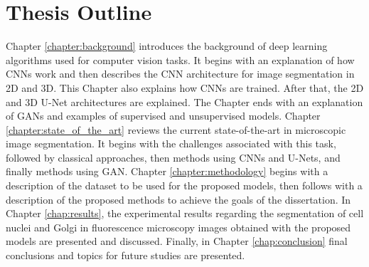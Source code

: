 
\section{Thesis Outline}

Chapter \ref{chapter:background} introduces the background of deep learning algorithms used for computer vision tasks. It begins with an explanation of how \ac{CNNs} work and then describes the \ac{CNN} architecture for image segmentation in \ac{2D} and \ac{3D}. This Chapter also explains how \ac{CNNs} are trained. After that, the \ac{2D} and \ac{3D} U-Net architectures are explained. The Chapter ends with an explanation of \ac{GANs} and examples of supervised and unsupervised models. Chapter \ref{chapter:state_of_the_art} reviews the current state-of-the-art in microscopic image segmentation. It begins with the challenges associated with this task, followed by classical approaches, then methods using \ac{CNNs} and U-Nets, and finally methods using \ac{GAN}. Chapter \ref{chapter:methodology} begins with a description of the dataset to be used for the proposed models, then follows with a description of the proposed methods to achieve the goals of the dissertation. In Chapter \ref{chap:results}, the experimental results regarding the segmentation of cell nuclei and Golgi in fluorescence microscopy images obtained with the proposed models are presented and discussed. Finally, in Chapter \ref{chap:conclusion} final conclusions and topics for future studies are presented.